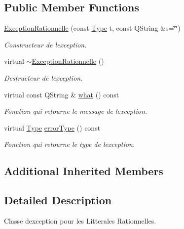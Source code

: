 \subsection*{Public Member Functions}
\begin{DoxyCompactItemize}
\item 
\hyperlink{class_exception_rationnelle_af513b6155626b0582b700f366b19868f}{Exception\+Rationnelle} (const \hyperlink{class_exception_rationnelle_ac394933986da15ec9b40db3d46c32887}{Type} t, const Q\+String \&s=\char`\"{}\char`\"{})
\begin{DoxyCompactList}\small\item\em Constructeur de l\textquotesingle{}exception. \end{DoxyCompactList}\item 
virtual \hyperlink{class_exception_rationnelle_ae606e24017d4b5accf5878b6fee5be6c}{$\sim$\+Exception\+Rationnelle} ()\hypertarget{class_exception_rationnelle_ae606e24017d4b5accf5878b6fee5be6c}{}\label{class_exception_rationnelle_ae606e24017d4b5accf5878b6fee5be6c}

\begin{DoxyCompactList}\small\item\em Destructeur de l\textquotesingle{}exception. \end{DoxyCompactList}\item 
virtual const Q\+String \& \hyperlink{class_exception_rationnelle_a09a2ad10a9e9846a090fb0654dd12a05}{what} () const 
\begin{DoxyCompactList}\small\item\em Fonction qui retourne le message de l\textquotesingle{}exception. \end{DoxyCompactList}\item 
virtual \hyperlink{class_exception_rationnelle_ac394933986da15ec9b40db3d46c32887}{Type} \hyperlink{class_exception_rationnelle_a5b49afaeb0dba99688c25466d57df586}{error\+Type} () const 
\begin{DoxyCompactList}\small\item\em Fonction qui retourne le type de l\textquotesingle{}exception. \end{DoxyCompactList}\end{DoxyCompactItemize}
\subsection*{Additional Inherited Members}


\subsection{Detailed Description}
Classe d\textquotesingle{}exception pour les Litterales Rationnelles. 

